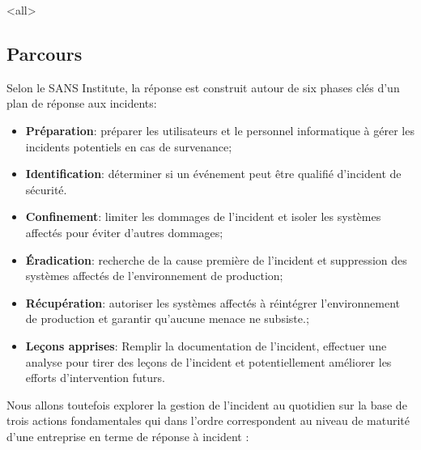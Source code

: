 \mode<all>{}

\subsection{Parcours}



Selon le SANS Institute, la réponse est construit autour de six phases clés d'un plan de réponse aux incidents:

\begin{itemize}
  \item \textbf{Préparation}: préparer les utilisateurs et le personnel informatique à gérer les incidents potentiels en cas de survenance;
  \item \textbf{Identification}: déterminer si un événement peut être qualifié d'incident de sécurité.
  \item \textbf{Confinement}: limiter les dommages de l'incident et isoler les systèmes affectés pour éviter d'autres dommages;
  \item \textbf{Éradication}: recherche de la cause première de l'incident et suppression des systèmes affectés de l'environnement de production;
  \item \textbf{Récupération}: autoriser les systèmes affectés à réintégrer l'environnement de production et garantir qu'aucune menace ne subsiste.;
  \item \textbf{Leçons apprises}: Remplir la documentation de l'incident, effectuer une analyse pour tirer des leçons de l'incident et potentiellement améliorer les efforts d'intervention futurs.
\end{itemize}


Nous allons toutefois explorer la  gestion de l'incident au quotidien sur la base de trois actions fondamentales qui dans l'ordre correspondent au niveau de maturité d'une entreprise en terme de réponse à incident :


